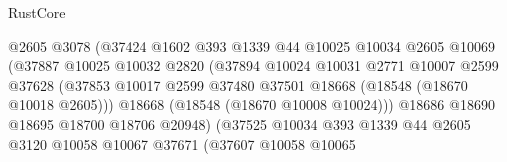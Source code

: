 \begin{lexlean}{RustCore}
\begin{coremodule}
                                        @2605
                                        @3078
                                        (@37424
                                          @1602
                                          @393
                                          @1339
                                          @44
                                          @10025
                                          @10034
                                          @2605
                                          @10069
                                          (@37887
                                            @10025
                                            @10032
                                            @2820
                                            (@37894
                                              @10024
                                              @10031
                                              @2771
                                              @10007
                                              @2599
                                              @37628
                                              (@37853
                                                @10017
                                                @2599
                                                @37480
                                                @37501
                                                @18668
                                                (@18548 (@18670 @10018 @2605)))
                                              @18668
                                              (@18548 (@18670 @10008 @10024)))
                                            @18686
                                            @18690
                                            @18695
                                            @18700
                                            @18706
                                            @20948)
                                          (@37525
                                            @10034
                                            @393
                                            @1339
                                            @44
                                            @2605
                                            @3120
                                            @10058
                                            @10067
                                            @37671
                                            (@37607
                                              @10058
                                              @10065

\end{coremodule}
\end{lexlean}
